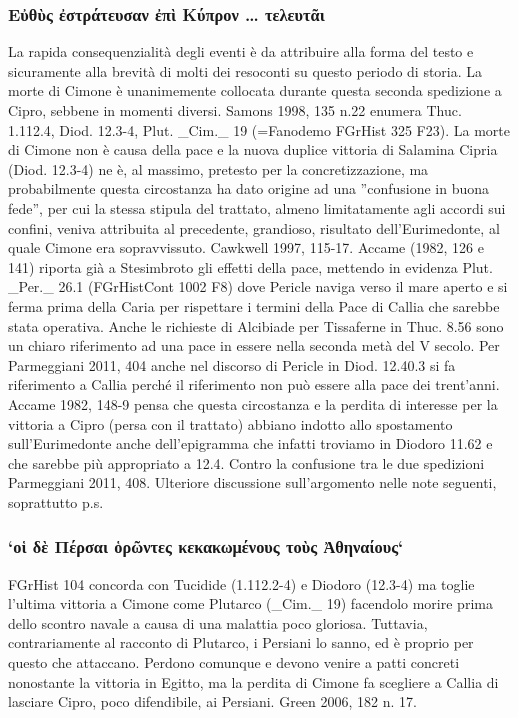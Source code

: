 {            \subsubsection{\textgreek{Εὐθὺς ἐστράτευσαν ἐπὶ Κύπρον … τελευτᾶι}}
            La rapida consequenzialità degli eventi è da attribuire alla forma del testo e sicuramente alla brevità di molti dei resoconti su questo periodo di storia. La morte di  Cimone è unanimemente collocata durante questa seconda spedizione a Cipro, sebbene in momenti diversi. Samons 1998, 135 n.22 enumera Thuc. 1.112.4, Diod. 12.3-4, Plut. _Cim._ 19 (=Fanodemo FGrHist 325 F23). La morte di  Cimone non è causa della pace e la nuova duplice vittoria di Salamina Cipria (Diod. 12.3-4) ne è, al massimo, pretesto per la concretizzazione, ma probabilmente questa circostanza ha dato origine ad una ''confusione in buona fede'', per cui la stessa stipula del trattato, almeno limitatamente agli accordi sui confini, veniva attribuita al precedente, grandioso, risultato dell'Eurimedonte, al quale  Cimone era sopravvissuto.  Cawkwell 1997, 115-17. Accame (1982, 126 e 141) riporta già a Stesimbroto gli effetti della pace, mettendo in evidenza Plut. _Per._ 26.1 (FGrHistCont 1002 F8) dove Pericle  naviga verso il mare aperto e si ferma prima della Caria per rispettare i termini della Pace di Callia che sarebbe stata operativa. Anche le richieste di Alcibiade per Tissaferne in Thuc. 8.56 sono un chiaro riferimento ad una pace in essere nella seconda metà del V secolo. Per Parmeggiani 2011, 404 anche nel discorso di Pericle  in Diod. 12.40.3 si fa riferimento a Callia perché il riferimento non può essere alla pace dei trent'anni. Accame 1982, 148-9 pensa che questa circostanza e la perdita di interesse per la vittoria a Cipro (persa con il trattato) abbiano indotto allo spostamento sull'Eurimedonte anche dell'epigramma che infatti troviamo in  Diodoro 11.62 e che sarebbe più appropriato a 12.4. Contro la confusione tra le due spedizioni Parmeggiani 2011, 408. Ulteriore discussione sull'argomento nelle note seguenti, soprattutto p.s.
            \subsubsection{`οἱ δὲ Πέρσαι ὁρῶντες κεκακωμένους τοὺς Ἀθηναίους`}
            FGrHist 104 concorda con Tucidide (1.112.2-4) e  Diodoro (12.3-4) ma toglie l'ultima vittoria a  Cimone come Plutarco (_Cim._ 19) facendolo morire prima dello scontro navale a causa di una malattia poco gloriosa. Tuttavia, contrariamente al racconto di Plutarco, i Persiani lo sanno, ed è proprio per questo che attaccano. Perdono comunque e devono venire a patti concreti nonostante la vittoria in Egitto, ma la perdita di  Cimone fa scegliere a Callia di lasciare Cipro, poco difendibile, ai Persiani. Green 2006, 182 n. 17.
}
